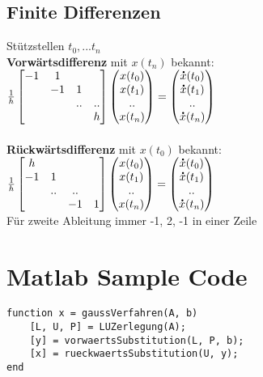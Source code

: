 \documentclass[german]{latex4ei/latex4ei_sheet}
\begin{document}
\begin{sectionbox}
\subsection{Finite Differenzen}
Stützstellen $t_0, ... t_n$\\
\textbf{Vorwärtsdifferenz} mit $x(t_n)$ bekannt:\\
$\frac{1}{h} \mat{ -1 & 1 & & \\ & -1 & 1 & \\ & & .. & .. \\ & & & h } \vect{ x(t_0) \\ x(t_1) \\ .. \\ x(t_n)} = \vect{ \dot x(t_0) \\ \dot x(t_1) \\ .. \\ \dot x(t_n)}$\\
\\
\textbf{Rückwärtsdifferenz} mit $x(t_0)$ bekannt:\\
$\frac{1}{h} \mat{ h & & & \\ -1 & 1 & & \\ & .. & .. & \\ & & -1 & 1 } \vect{ x(t_0) \\ x(t_1) \\ .. \\ x(t_n)} = \vect{ \dot x(t_0) \\ \dot x(t_1) \\ .. \\ \dot x(t_n)}$\\
Für zweite Ableitung immer -1, 2, -1 in einer Zeile\\

\end{sectionbox}




\section{Matlab Sample Code}
\begin{lstlisting}
function x = gaussVerfahren(A, b)
    [L, U, P] = LUZerlegung(A);
    [y] = vorwaertsSubstitution(L, P, b);
    [x] = rueckwaertsSubstitution(U, y);
end
\end{lstlisting}
\end{document}

